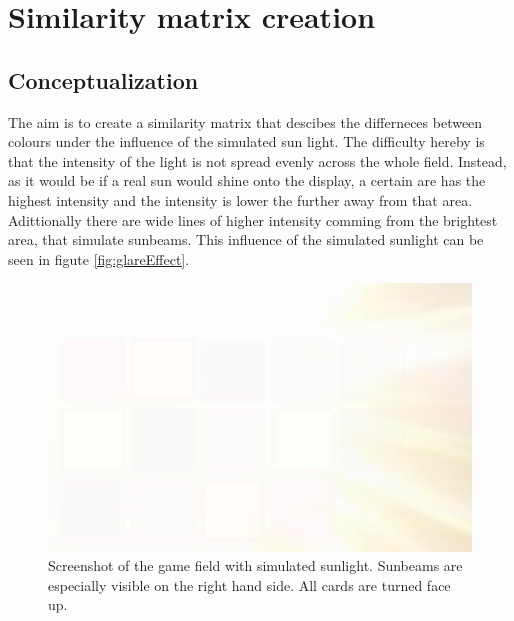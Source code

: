 \section{Similarity matrix creation}
\label{similarity_matrix_cretion}

\subsection{Conceptualization}
\label{conceptualization}
The aim is to create a similarity matrix that descibes the differneces between colours under the influence of the simulated sun light. The difficulty hereby is that the intensity of the light is not spread evenly across the whole field. Instead, as it would be if a real sun would shine onto the display, a certain are has the highest intensity and the intensity is lower the further away from that area. Adittionally there are wide lines of higher intensity comming from the brightest area, that simulate sunbeams. This influence of the simulated sunlight can be seen in figute \ref{fig:glareEffect}. 

\begin{figure}[H]
	\centering
	\includegraphics[width=14cm]{images/glareEffect.png}
	\caption[Bild kurz]{Screenshot of the game field with simulated sunlight. Sunbeams are especially visible on the right hand side. All cards are turned face up.}
	\label{fig:glareEffect2}
\end{figure}

